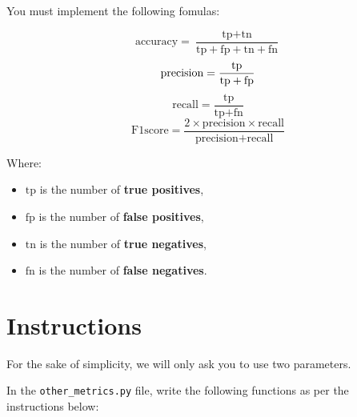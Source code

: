 \documentclass{42-en}
\begin{document}
You must implement the following fomulas: 

$$
\text{accuracy} = \frac{\text{tp} + \text{tn}}{\text{tp} + \text{fp} + \text{tn} + \text{fn}}
$$
$$
\text{precision} = \frac{\text{\text{tp}}}{\text{tp} + \text{fp}}
$$
$$
\text{recall} = \frac{\text{tp}}{\text{tp} + \text{fn}}
$$
$$
\text{F1score} = \frac{2 \times \text{precision} \times \text{recall}}{\text{precision} + \text{recall}}
$$

Where:
\begin{itemize}
  \item $\text{tp}$ is the number of \textbf{true positives},
  \item $\text{fp}$ is the number of \textbf{false positives},
  \item $\text{tn}$ is the number of \textbf{true negatives},
  \item $\text{fn}$ is the number of \textbf{false negatives}.
\end{itemize}

\section*{Instructions}
For the sake of simplicity, we will only ask you to use two parameters.

In the \texttt{other\_metrics.py} file, write the following functions as per the instructions below:
\end{document}
